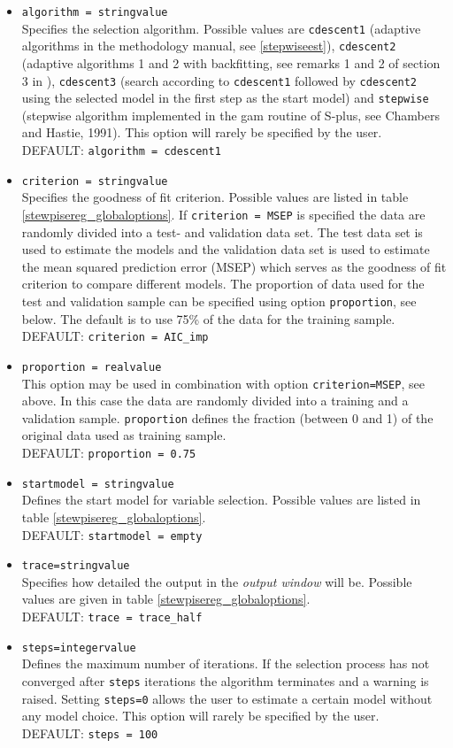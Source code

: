 \begin{itemize}
\item {\tt algorithm = stringvalue} \\
Specifies the selection algorithm. Possible values are {\tt cdescent1} (adaptive algorithms in the methodology manual, see
\autoref{stepwiseest}), {\tt cdescent2} (adaptive algorithms  1 and 2 with backfitting, see remarks 1 and 2 of section 3 in
), {\tt cdescent3} (search according to {\tt cdescent1}  followed by {\tt cdescent2}  using the
selected model in the first step as the start model) and {\tt stepwise} (stepwise algorithm implemented in the gam routine
of S-plus, see Chambers and Hastie, 1991).
This option will rarely be specified by the user. \\
DEFAULT: {\tt algorithm = cdescent1}
\item {\tt criterion = stringvalue} \\
Specifies the goodness of  fit criterion. Possible values are listed in table \autoref{stewpisereg_globaloptions}. If {\tt criterion = MSEP} is specified
the data are randomly divided into a test- and validation data set. The test data set is used to estimate the models and the validation data set is used to
estimate the mean squared prediction error (MSEP) which serves as the goodness of fit criterion to compare different models. The proportion of data used for
the test and validation sample can be specified using option {\tt proportion}, see below. The default is to use 75\% of the data for the training sample. \\
DEFAULT: {\tt criterion = AIC\_imp}
\item {\tt proportion = realvalue} \\
This option may be used in combination with option {\tt criterion=MSEP}, see above. In this case the data are randomly divided into
a training and a validation sample. {\tt proportion} defines the fraction (between 0 and 1)  of the original data used as training sample. \\
DEFAULT: {\tt proportion = 0.75}
\item {\tt startmodel = stringvalue} \\
Defines the start model for variable selection. Possible values are listed in table \autoref{stewpisereg_globaloptions}. \\
DEFAULT: {\tt startmodel = empty}
\item {\tt trace=stringvalue} \\
Specifies how detailed the output in the {\it output window} will be. Possible values are given in table \autoref{stewpisereg_globaloptions}. \\
DEFAULT: {\tt trace = trace\_half}
\item {\tt steps=integervalue}   \\
Defines the maximum number of iterations.  If the selection process  has not converged after {\tt steps} iterations the algorithm terminates and a warning is
raised. Setting {\tt steps=0} allows the user to estimate a certain model without any model choice. This option will rarely be specified by the user.\\
DEFAULT: {\tt steps = 100}
\end{itemize}


